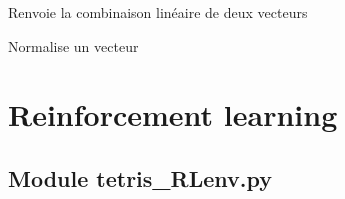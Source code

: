\documentclass[letterpaper,10pt,french]{sphinxmanual}
\begin{document}

\begin{fulllineitems}
\label{\detokenize{index:ag_optimizer.linearCombination}}
Renvoie la combinaison linéaire de deux vecteurs

\end{fulllineitems}


\begin{fulllineitems}
\label{\detokenize{index:ag_optimizer.normalize}}
Normalise un vecteur

\end{fulllineitems}


\begin{fulllineitems}
\label{\detokenize{index:ag_optimizer.random}}\pysiglinewithargsret{\sphinxcode{ag\_optimizer.}\sphinxbfcode{random}}{}{{ $\rightarrow$ x in the interval {[}0, 1).}}
\end{fulllineitems}



\chapter{Reinforcement learning}
\label{\detokenize{index:reinforcement-learning}}

\section{Module tetris\_RLenv.py}
\label{\detokenize{index:module-tetris_RLenv}}\label{\detokenize{index:module-tetris-rlenv-py}}
\end{document}
